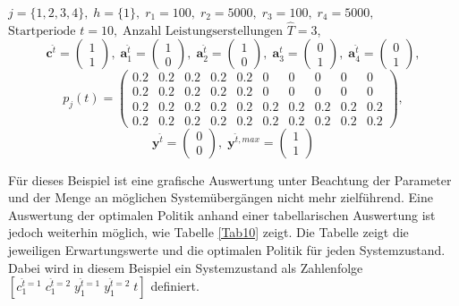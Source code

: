 {\begin{center}
$j = \{1, 2, 3, 4\}, \; h = \{1\}, \; r_{1} = 100, \; r_{2} = 5000, \; r_{3} = 100, \; r_{4} = 5000,$ \\
$\text{Startperiode } t=10, \; \text{Anzahl Leistungserstellungen } \hat{T}= 3  $,
\[\textbf{c}^{\hat{t}}=\begin{pmatrix} 1\\ 1  \end{pmatrix}, \;
    \textbf{a}^{\hat t}_1=\begin{pmatrix} 1\\ 0  \end{pmatrix}, \;
\textbf{a}^{\hat t}_2=\begin{pmatrix} 1\\ 0  \end{pmatrix}, \;
\textbf{a}^{\hat t}_3=\begin{pmatrix} 0\\ 1  \end{pmatrix}, \;
\textbf{a}^{\hat t}_4=\begin{pmatrix} 0\\ 1  \end{pmatrix}, \]
         \[ p_{j}(t)=
       \begin{pmatrix}
       0.2 & 0.2 & 0.2 & 0.2 & 0.2 & 0 & 0 & 0 & 0 & 0\\
       0.2 & 0.2 & 0.2 & 0.2 & 0.2 & 0 & 0 & 0 & 0 & 0\\
       0.2 & 0.2 & 0.2 & 0.2 & 0.2 & 0.2 & 0.2 & 0.2 & 0.2 & 0.2\\
       0.2 & 0.2 & 0.2 & 0.2 & 0.2 & 0.2 & 0.2 & 0.2 & 0.2 & 0.2
\end{pmatrix}, 
  \]
  \[
    \textbf{y}^{\hat t}= \begin{pmatrix} 0\\ 0\end{pmatrix}, \;
    \textbf{y}^{\hat t, max}=\begin{pmatrix} 1\\ 1  \end{pmatrix}
      \]
\end{center}}

Für dieses Beispiel ist eine grafische Auswertung unter Beachtung der Parameter und der Menge an möglichen Systemübergängen nicht mehr zielführend. Eine Auswertung der optimalen Politik anhand einer tabellarischen Auswertung ist jedoch weiterhin möglich, wie Tabelle \ref{Tab10} zeigt. Die Tabelle zeigt die jeweiligen Erwartungswerte und die optimalen Politik für jeden Systemzustand. Dabei wird in diesem Beispiel ein Systemzustand als Zahlenfolge $[c_1^{\hat t=1}\;c_1^{\hat t=2}\;y_1^{\hat t=1}\;y_1^{\hat t=2}\;t]$ definiert.

